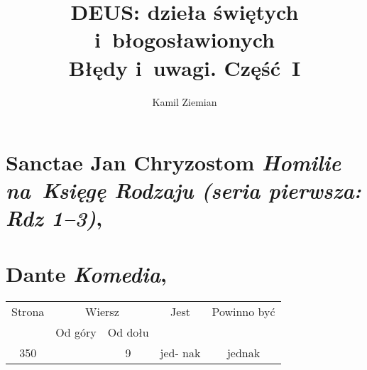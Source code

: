 \documentclass[a4paper,11pt]{article}
\title{DEUS: dzieła świętych i~błogosławionych \\
  {\Large Błędy i~uwagi. Część~I}}
\author{Kamil Ziemian}
\numberwithin{equation}{section}
\begin{document}





\maketitle





\section{Sanctae Jan Chryzostom
  \textit{Homilie na~Księgę Rodzaju (seria pierwsza: Rdz 1--3)},
  \parencite{SancteJanChryzostomHomKsiegaRodzaju2008}}











\section{Dante \textit{Komedia}, \cite{DAK}}






\begin{center}

  \begin{tabular}{|c|c|c|c|c|}
    \hline
    Strona & \multicolumn{2}{c|}{Wiersz} & Jest
                              & Powinno być \\ \cline{2-3}
    & Od góry & Od dołu & & \\
    \hline
    350 & & 9 & jed- nak & jednak \\
    \hline
  \end{tabular}

\end{center}
\end{document}
